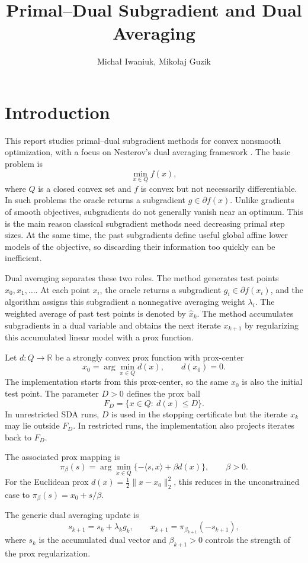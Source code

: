 \documentclass[11pt]{article}
\title{Primal--Dual Subgradient and Dual Averaging}
\author{Michał Iwaniuk, Mikołaj Guzik}
\date{}
\begin{document}
\maketitle

\section{Introduction}
This report studies primal--dual subgradient methods for convex nonsmooth
optimization, with a focus on Nesterov's dual averaging framework
\cite{nesterov_primal_dual}.  The basic problem is
\[
    \min_{x\in Q} f(x),
\]
where \(Q\) is a closed convex set and \(f\) is convex but not necessarily
differentiable.  In such problems the oracle returns a subgradient
\(g\in\partial f(x)\).  Unlike gradients of smooth objectives, subgradients do
not generally vanish near an optimum.  This is the main reason classical
subgradient methods need decreasing primal step sizes.  At the same time, the
past subgradients define useful global affine lower models of the objective, so
discarding their information too quickly can be inefficient.

Dual averaging separates these two roles.  The method generates test points
\(x_0,x_1,\ldots\).  At each point \(x_i\), the oracle returns a subgradient
\(g_i\in\partial f(x_i)\), and the algorithm assigns this subgradient a
nonnegative averaging weight \(\lambda_i\).  The weighted average of past test
points is denoted by \(\hat x_k\).  The method accumulates subgradients in a
dual variable and obtains the next iterate \(x_{k+1}\) by regularizing this
accumulated linear model with a prox function.

Let \(d:Q\to\mathbb R\) be a strongly convex prox function with prox-center
\[
    x_0=\arg\min_{x\in Q} d(x),\qquad d(x_0)=0.
\]
The implementation starts from this prox-center, so the same \(x_0\) is also
the initial test point.
The parameter \(D>0\) defines the prox ball
\[
    F_D=\{x\in Q:\ d(x)\le D\}.
\]
In unrestricted SDA runs, \(D\) is used in the stopping certificate but the
iterate \(x_k\) may lie outside \(F_D\).  In restricted runs, the implementation
also projects iterates back to \(F_D\).

The associated prox mapping is
\[
    \pi_\beta(s)=
    \arg\min_{x\in Q}\{-\langle s,x\rangle+\beta d(x)\},
    \qquad \beta>0.
\]
For the Euclidean prox \(d(x)=\frac12\|x-x_0\|_2^2\), this reduces in the
unconstrained case to \(\pi_\beta(s)=x_0+s/\beta\).

The generic dual averaging update is
\[
    s_{k+1}=s_k+\lambda_k g_k,
    \qquad
    x_{k+1}=\pi_{\beta_{k+1}}(-s_{k+1}),
\]
where \(s_k\) is the accumulated dual vector and \(\beta_{k+1}>0\) controls the
strength of the prox regularization.
\end{document}
